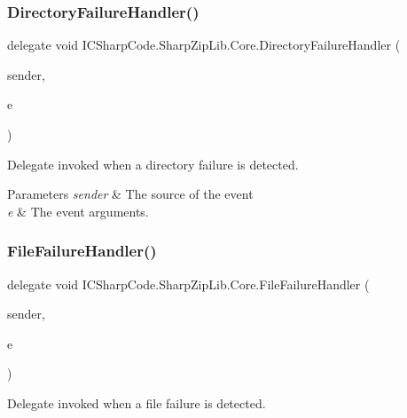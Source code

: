 \subsubsection{\texorpdfstring{Directory\+Failure\+Handler()}{DirectoryFailureHandler()}}
{\footnotesize\ttfamily delegate void I\+C\+Sharp\+Code.\+Sharp\+Zip\+Lib.\+Core.\+Directory\+Failure\+Handler (\begin{DoxyParamCaption}\item[{object}]{sender,  }\item[{\hyperlink{class_i_c_sharp_code_1_1_sharp_zip_lib_1_1_core_1_1_scan_failure_event_args}{Scan\+Failure\+Event\+Args}}]{e }\end{DoxyParamCaption})}



Delegate invoked when a directory failure is detected. 


\begin{DoxyParams}{Parameters}
{\em sender} & The source of the event\\
\hline
{\em e} & The event arguments.\\
\hline
\end{DoxyParams}
\mbox{\label{namespace_i_c_sharp_code_1_1_sharp_zip_lib_1_1_core_a956b875da234d5808c4151b3ac822f80}} 
\subsubsection{\texorpdfstring{File\+Failure\+Handler()}{FileFailureHandler()}}
{\footnotesize\ttfamily delegate void I\+C\+Sharp\+Code.\+Sharp\+Zip\+Lib.\+Core.\+File\+Failure\+Handler (\begin{DoxyParamCaption}\item[{object}]{sender,  }\item[{\hyperlink{class_i_c_sharp_code_1_1_sharp_zip_lib_1_1_core_1_1_scan_failure_event_args}{Scan\+Failure\+Event\+Args}}]{e }\end{DoxyParamCaption})}



Delegate invoked when a file failure is detected. 



